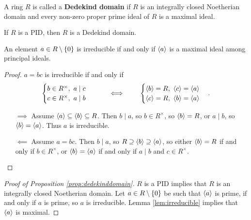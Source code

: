 \begin{definition}
A ring $ R $ is called a \textbf{Dedekind domain} if $ R $ is an integrally closed Noetherian domain and every non-zero proper prime ideal of $ R $ is a maximal ideal.
\end{definition}

\begin{proposition}
\label{prop:dedekinddomain}
If $ R $ is a PID, then $ R $ is a Dedekind domain.
\end{proposition}

\begin{lemma}
\label{lem:irreducible}
An element $ a \in R \setminus \cbr{0} $ is irreducible if and only if $ \left\langle a \right\rangle $ is a maximal ideal among principal ideals.
\end{lemma}

\begin{proof}
$ a = bc $ is irreducible if and only if
$$
\begin{cases}
b \in R^\times, \ a \mid c \\
c \in R^\times, \ a \mid b
\end{cases}
\qquad \iff \qquad
\begin{cases}
\left\langle b \right\rangle = R, \ \left\langle c \right\rangle = \left\langle a \right\rangle \\
\left\langle c \right\rangle = R, \ \left\langle b \right\rangle = \left\langle a \right\rangle
\end{cases}.
$$
\begin{itemize}
\item[$ \implies $] Assume $ \left\langle a \right\rangle \subseteq \left\langle b \right\rangle \subseteq R $. Then $ b \mid a $, so $ b \in R^\times $, so $ \left\langle b \right\rangle = R $, or $ a \mid b $, so $ \left\langle b \right\rangle = \left\langle a \right\rangle $. Thus $ a $ is irreducible.
\item[$ \impliedby $] Assume $ a = bc $. Then $ b \mid a $, so $ R \supseteq \left\langle b \right\rangle \supseteq \left\langle a \right\rangle $, so either $ \left\langle b \right\rangle = R $ if and only if $ b \in R^\times $, or $ \left\langle b \right\rangle = \left\langle a \right\rangle $ if and only if $ a \mid b $ and $ c \in R^\times $.
\end{itemize}
\end{proof}

\begin{proof}[Proof of Proposition \ref{prop:dedekinddomain}]
$ R $ is a PID implies that $ R $ is an integrally closed Noetherian domain. Let $ a \in R \setminus \cbr{0} $ be such that $ \left\langle a \right\rangle $ is prime, if and only if $ a $ is prime, so $ a $ is irreducible. Lemma \ref{lem:irreducible} implies that $ \left\langle a \right\rangle $ is maximal.
\end{proof}

